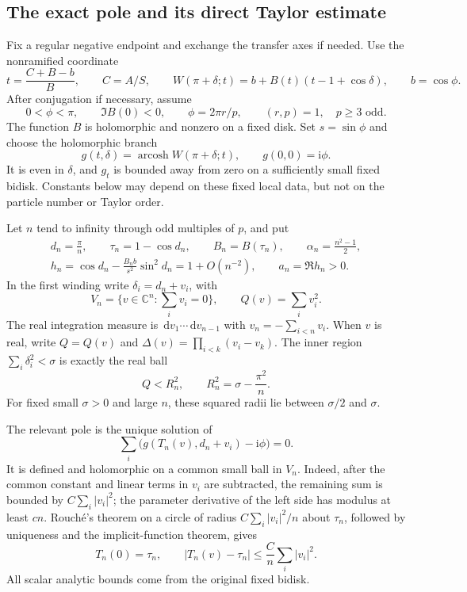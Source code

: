 \documentclass[11pt]{article}
\numberwithin{equation}{section}
\theoremstyle{definition}
\newcommand{\C}{\mathbb C}
\newcommand{\dd}{\,\mathrm d}
\newcommand{\ii}{\mathrm i}
\begin{document}
\subsection{The exact pole and its direct Taylor estimate}

Fix a regular negative endpoint and exchange the transfer axes if needed.
Use the nonramified coordinate
\begin{equation}\label{eq:rc-coordinate}
 t=\frac{C+B-b}{B},\qquad C=A/S,\qquad
 W(\pi+\delta;t)=b+B(t)(t-1+\cos\delta),\qquad b=\cos\phi.
\end{equation}
After conjugation if necessary, assume
\begin{equation}\label{eq:rc-phase}
 0<\phi<\pi,\qquad \Im B(0)<0,\qquad
 \phi=2\pi r/p,\qquad (r,p)=1,\quad p\ge3\text{ odd}.
\end{equation}
The function $B$ is holomorphic and nonzero on a fixed disk.  Set
$s=\sin\phi$ and choose the holomorphic branch
\[
 g(t,\delta)=\operatorname{arcosh}W(\pi+\delta;t),\qquad
 g(0,0)=\ii\phi.
\]
It is even in $\delta$, and $g_t$ is bounded away from zero on a
sufficiently small fixed bidisk.  Constants below may depend on these
fixed local data, but not on the particle number or Taylor order.

Let $n$ tend to infinity through odd multiples of $p$, and put
\begin{gather}
 d_n=\frac\pi n,\qquad \tau_n=1-\cos d_n,\qquad
 B_n=B(\tau_n),\qquad \alpha_n=\frac{n^2-1}{2},\label{eq:rc-centres}\\
 h_n=\cos d_n-\frac{B_n b}{s^2}\sin^2d_n=1+O(n^{-2}),\qquad
 a_n=\Re h_n>0.\label{eq:rc-h}
\end{gather}
In the first winding write $\delta_i=d_n+v_i$, with
\[
 V_n=\{v\in\C^n:\sum_i v_i=0\},\qquad Q(v)=\sum_i v_i^2.
\]
The real integration measure is $\dd v_1\cdots\dd v_{n-1}$ with
$v_n=-\sum_{i<n}v_i$.  When $v$ is real, write $Q=Q(v)$ and
$\Delta(v)=\prod_{i<k}(v_i-v_k)$.  The inner region
$\sum_i\delta_i^2<\sigma$ is exactly the real ball
\begin{equation}\label{eq:rc-actual-ball}
 Q<R_n^2,\qquad R_n^2=\sigma-\frac{\pi^2}{n}.
\end{equation}
For fixed small $\sigma>0$ and large $n$, these squared radii lie
between $\sigma/2$ and $\sigma$.

The relevant pole is the unique solution of
\begin{equation}\label{eq:rc-pole-equation}
 \sum_i\bigl(g(T_n(v),d_n+v_i)-\ii\phi\bigr)=0.
\end{equation}
It is defined and holomorphic on a common small ball in $V_n$.
Indeed, after the common constant and linear terms in $v_i$ are
subtracted, the remaining sum is bounded by $C\sum_i|v_i|^2$;
the parameter derivative of the left side has modulus at least $cn$.
Rouch\'e's theorem on a circle of radius
$C\sum_i|v_i|^2/n$ about $\tau_n$, followed by uniqueness and the
implicit-function theorem, gives
\begin{equation}\label{eq:rc-pole-coarse}
 T_n(0)=\tau_n,\qquad
 |T_n(v)-\tau_n|\le\frac Cn\sum_i|v_i|^2.
\end{equation}
All scalar analytic bounds come from the original fixed bidisk.
\end{document}
